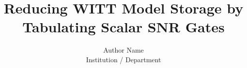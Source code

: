 \documentclass[10pt,twocolumn,letterpaper]{article}
\title{Reducing WITT Model Storage by Tabulating Scalar SNR Gates}
\author{Author Name\\Institution / Department}
\begin{document}
\maketitle







{\small}
\appendix

\end{document}
